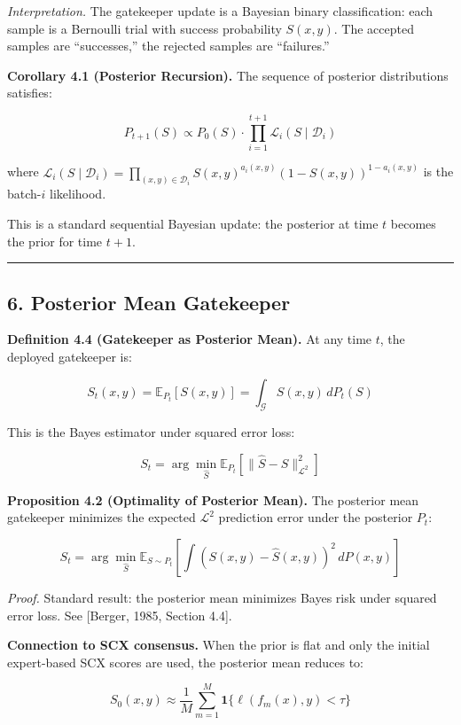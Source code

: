 \documentclass[
  12pt,
]{article}
\begin{document}
\emph{Interpretation.} The gatekeeper update is a Bayesian binary
classification: each sample is a Bernoulli trial with success
probability \(S(x,y)\). The accepted samples are ``successes,'' the
rejected samples are ``failures.''

\textbf{Corollary 4.1 (Posterior Recursion).} The sequence of posterior
distributions satisfies:

\[
P_{t+1}(S) \propto P_0(S) \cdot \prod_{i=1}^{t+1} \mathcal{L}_i(S \mid \mathcal{D}_i)
\]

where
\(\mathcal{L}_i(S \mid \mathcal{D}_i) = \prod_{(x,y) \in \mathcal{D}_i} S(x,y)^{a_i(x,y)} (1 - S(x,y))^{1-a_i(x,y)}\)
is the batch-\(i\) likelihood.

This is a standard sequential Bayesian update: the posterior at time
\(t\) becomes the prior for time \(t+1\).

\begin{center}\rule{0.5\linewidth}{0.5pt}\end{center}

\subsection{6. Posterior Mean
Gatekeeper}\label{posterior-mean-gatekeeper}

\textbf{Definition 4.4 (Gatekeeper as Posterior Mean).} At any time
\(t\), the deployed gatekeeper is:

\[
S_t(x,y) = \mathbb{E}_{P_t}[S(x,y)] = \int_{\mathcal{G}} S(x,y) \, dP_t(S)
\]

This is the Bayes estimator under squared error loss:

\[
S_t = \arg\min_{\hat{S}} \mathbb{E}_{P_t}[\|\hat{S} - S\|^2_{\mathcal{L}^2}]
\]

\textbf{Proposition 4.2 (Optimality of Posterior Mean).} The posterior
mean gatekeeper minimizes the expected \(\mathcal{L}^2\) prediction
error under the posterior \(P_t\):

\[
S_t = \arg\min_{\hat{S}} \mathbb{E}_{S \sim P_t} \left[ \int (S(x,y) - \hat{S}(x,y))^2 \, dP(x,y) \right]
\]

\emph{Proof.} Standard result: the posterior mean minimizes Bayes risk
under squared error loss. See {[}Berger, 1985, Section 4.4{]}.

\textbf{Connection to SCX consensus.} When the prior is flat and only
the initial expert-based SCX scores are used, the posterior mean reduces
to:

\[
S_0(x,y) \approx \frac{1}{M}\sum_{m=1}^M \mathbf{1}\{\ell(f_m(x), y) < \tau\}
\]
\end{document}
